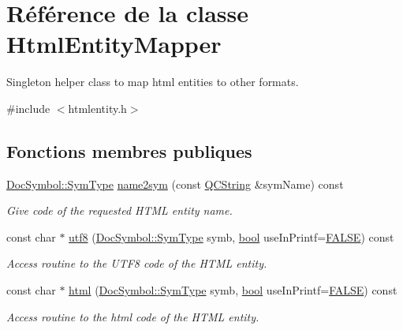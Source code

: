 \hypertarget{class_html_entity_mapper}{}\section{Référence de la classe Html\+Entity\+Mapper}
\label{class_html_entity_mapper}


Singleton helper class to map html entities to other formats.  




{\ttfamily \#include $<$htmlentity.\+h$>$}

\subsection*{Fonctions membres publiques}
\begin{DoxyCompactItemize}
\item 
\hyperlink{class_doc_symbol_abea9ba345564542cc6b65ae4c76be6c2}{Doc\+Symbol\+::\+Sym\+Type} \hyperlink{class_html_entity_mapper_a4bc462512023c6698e6a1176f1a88999}{name2sym} (const \hyperlink{class_q_c_string}{Q\+C\+String} \&sym\+Name) const 
\begin{DoxyCompactList}\small\item\em Give code of the requested H\+T\+M\+L entity name. \end{DoxyCompactList}\item 
const char $\ast$ \hyperlink{class_html_entity_mapper_a0c1aef06cbed120b9e1ac386e1e500b5}{utf8} (\hyperlink{class_doc_symbol_abea9ba345564542cc6b65ae4c76be6c2}{Doc\+Symbol\+::\+Sym\+Type} symb, \hyperlink{qglobal_8h_a1062901a7428fdd9c7f180f5e01ea056}{bool} use\+In\+Printf=\hyperlink{qglobal_8h_a10e004b6916e78ff4ea8379be80b80cc}{F\+A\+L\+S\+E}) const 
\begin{DoxyCompactList}\small\item\em Access routine to the U\+T\+F8 code of the H\+T\+M\+L entity. \end{DoxyCompactList}\item 
const char $\ast$ \hyperlink{class_html_entity_mapper_a8a117e2fe7c7f38860f4d1123cb9734a}{html} (\hyperlink{class_doc_symbol_abea9ba345564542cc6b65ae4c76be6c2}{Doc\+Symbol\+::\+Sym\+Type} symb, \hyperlink{qglobal_8h_a1062901a7428fdd9c7f180f5e01ea056}{bool} use\+In\+Printf=\hyperlink{qglobal_8h_a10e004b6916e78ff4ea8379be80b80cc}{F\+A\+L\+S\+E}) const 
\begin{DoxyCompactList}\small\item\em Access routine to the html code of the H\+T\+M\+L entity. \end{DoxyCompactList}\item 

\end{DoxyCompactItemize}
